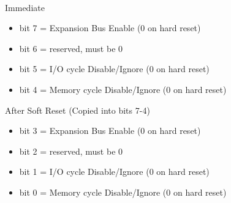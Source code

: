\\
Immediate
\begin{itemize}
\item bit 7 = Expansion Bus Enable (0 on hard reset)
\item bit 6 = reserved, must be 0
\item bit 5 = I/O cycle Disable/Ignore  (0 on
  hard reset)
\item bit 4 = Memory cycle Disable/Ignore  (0 on
  hard reset)
\end{itemize}
After Soft Reset (Copied into bits 7-4)
\begin{itemize}
\item bit 3 = Expansion Bus Enable (0 on hard reset)
\item bit 2 = reserved, must be 0
\item bit 1 = I/O cycle Disable/Ignore  (0 on
  hard reset)
\item bit 0 = Memory cycle Disable/Ignore  (0 on
  hard reset)
\end{itemize}

